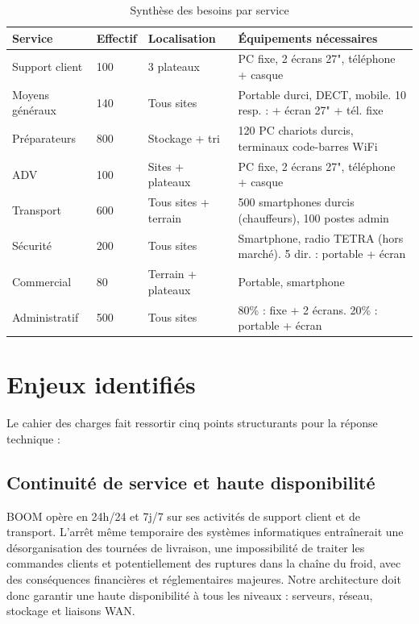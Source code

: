 \documentclass[12pt,a4paper]{report}
\begin{document}
\begin{table}[H]
\centering
\small
\begin{tabularx}{\textwidth}{@{}L{2.6cm}C{1.6cm}L{3.3cm}L{5.6cm}@{}}
\toprule
\textbf{Service} & \textbf{Effectif} & \textbf{Localisation} & \textbf{Équipements nécessaires} \\
\midrule
Support client & 100 & 3 plateaux & PC fixe, 2 écrans 27", téléphone + casque \\
\addlinespace
Moyens généraux & 140 & Tous sites & Portable durci, DECT, mobile. 10 resp. : + écran 27" + tél. fixe \\
\addlinespace
Préparateurs & 800 & Stockage + tri & 120 PC chariots durcis, terminaux code-barres WiFi \\
\addlinespace
ADV & 100 & Sites + plateaux & PC fixe, 2 écrans 27", téléphone + casque \\
\addlinespace
Transport & 600 & Tous sites + terrain & 500 smartphones durcis (chauffeurs), 100 postes admin \\
\addlinespace
Sécurité & 200 & Tous sites & Smartphone, radio TETRA (hors marché). 5 dir. : portable + écran \\
\addlinespace
Commercial & 80 & Terrain + plateaux & Portable, smartphone \\
\addlinespace
Administratif & 500 & Tous sites & 80\% : fixe + 2 écrans. 20\% : portable + écran \\
\bottomrule
\end{tabularx}
\caption{Synthèse des besoins par service}
\label{tab:besoins_services}
\end{table}

\section{Enjeux identifiés}

Le cahier des charges fait ressortir cinq points structurants pour la réponse technique :

\subsection{Continuité de service et haute disponibilité}

BOOM opère en 24h/24 et 7j/7 sur ses activités de support client et de transport. L'arrêt même temporaire des systèmes informatiques entraînerait une désorganisation des tournées de livraison, une impossibilité de traiter les commandes clients et potentiellement des ruptures dans la chaîne du froid, avec des conséquences financières et réglementaires majeures. Notre architecture doit donc garantir une haute disponibilité à tous les niveaux : serveurs, réseau, stockage et liaisons WAN.
\end{document}
